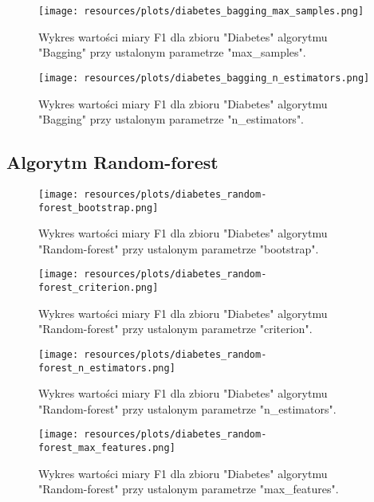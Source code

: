 \pagebreak
                    

\begin{figure}[H]
    \center
    \texttt{[image: resources/plots/diabetes\_bagging\_max\_samples.png]}
    \caption{Wykres wartości miary F1 dla zbioru "Diabetes" algorytmu "Bagging" przy ustalonym parametrze "max\_samples".}
\end{figure}

\pagebreak
                    

\begin{figure}[H]
    \center
    \texttt{[image: resources/plots/diabetes\_bagging\_n\_estimators.png]}
    \caption{Wykres wartości miary F1 dla zbioru "Diabetes" algorytmu "Bagging" przy ustalonym parametrze "n\_estimators".}
\end{figure}

\pagebreak
                    
\subsection{Algorytm Random-forest}


\begin{figure}[H]
    \center
    \texttt{[image: resources/plots/diabetes\_random-forest\_bootstrap.png]}
    \caption{Wykres wartości miary F1 dla zbioru "Diabetes" algorytmu "Random-forest" przy ustalonym parametrze "bootstrap".}   
\end{figure}                    

\pagebreak


\begin{figure}[H]
    \center
    \texttt{[image: resources/plots/diabetes\_random-forest\_criterion.png]}
    \caption{Wykres wartości miary F1 dla zbioru "Diabetes" algorytmu "Random-forest" przy ustalonym parametrze "criterion".}   
\end{figure}                    

\pagebreak


\begin{figure}[H]
    \center
    \texttt{[image: resources/plots/diabetes\_random-forest\_n\_estimators.png]}
    \caption{Wykres wartości miary F1 dla zbioru "Diabetes" algorytmu "Random-forest" przy ustalonym parametrze "n\_estimators".}
\end{figure}                    
                    
\pagebreak



\begin{figure}[H]
    \center
    \texttt{[image: resources/plots/diabetes\_random-forest\_max\_features.png]}
    \caption{Wykres wartości miary F1 dla zbioru "Diabetes" algorytmu "Random-forest" przy ustalonym parametrze "max\_features".}
\end{figure}

\pagebreak